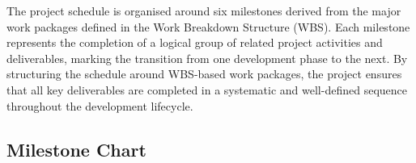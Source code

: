\documentclass[12pt,a4paper]{article}
\begin{document}
The project schedule is organised around six milestones derived from the major work packages defined in the Work Breakdown Structure (WBS). Each milestone represents the completion of a logical group of related project activities and deliverables, marking the transition from one development phase to the next. By structuring the schedule around WBS-based work packages, the project ensures that all key deliverables are completed in a systematic and well-defined sequence throughout the development lifecycle.

\subsection{Milestone Chart}

\end{document}
